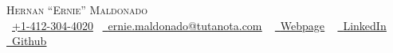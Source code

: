 	\begin{center}
	{\Huge \scshape Hernan ``Ernie'' Maldonado} \\ \vspace{5pt}
	\small \raisebox{-0.1\height}\faPhone\ \href{tel:14123044020}{+1-412-304-4020}~ \href{mailto:ernie.maldonado@tutanota.com}{\raisebox{-0.2\height}\faEnvelope\  \underline{ernie.maldonado@tutanota.com}} ~
	\href{https://hernanmaldonado.github.io}{\raisebox{-0.2\height}\faGlobe\ \underline{Webpage}} ~
	\href{https://www.linkedin.com/in/erniemaldonado-excellence}{\raisebox{-0.2\height}\faLinkedin\ \underline{LinkedIn}}  ~
	\href{https://github.com/hernanmaldonado/}{\raisebox{-0.2\height}\faGithub\ \underline{Github}}
	\vspace{-8pt}
\end{center}